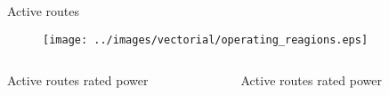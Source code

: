 \begin{frame}{Active routes}

  \begin{figure}[H]
    \centering
    \texttt{[image: ../images/vectorial/operating\_reagions.eps]}
  \end{figure}

  \begin{columns}
    \begin{column}{0.5\textwidth}
      Active routes  rated power
        \begin{center}
        \end{center}
    \end{column}
    \begin{column}{0.5\textwidth}
      Active routes  rated power
        \begin{center}
        \end{center}
    \end{column}
  \end{columns}
\end{frame}

                                                    
